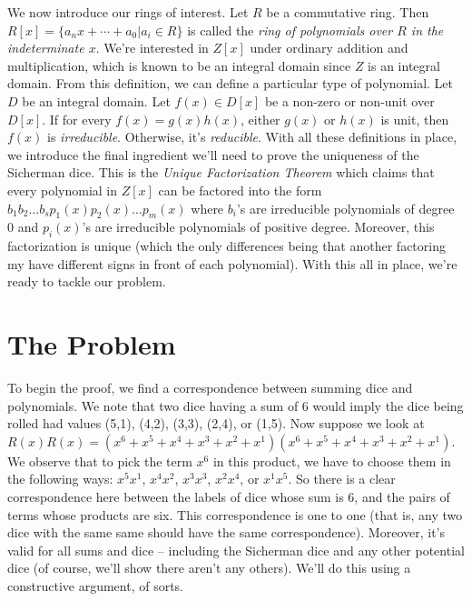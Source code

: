 \documentclass[12pt]{report}
\begin{document}
We now introduce our rings of interest. Let $R$ be a commutative ring. Then
$R[x]=\{ a_{n}x + \cdots + a_{0} | a_{i}\in R\}$ is called the \textit{ring of polynomials over $R$ in the
indeterminate $x$}. We're interested in $Z[x]$ under ordinary addition and multiplication, which is known to
be an integral domain since $Z$ is an integral domain. From this definition, we can define a particular type
of polynomial. Let $D$ be an integral domain. Let $f(x)\in D[x]$ be a non-zero or non-unit over $D[x]$. If for
every $f(x)=g(x)h(x)$, either $g(x)$ or $h(x)$ is unit, then $f(x)$ is \textit{irreducible}. Otherwise, it's
\textit{reducible}. With all these definitions in place, we introduce the final ingredient we'll need to prove
the uniqueness of the Sicherman dice. This is the \textit{Unique Factorization Theorem} which claims that
every polynomial in $Z[x]$ can be factored into the form
$b_{1}b_{2}\ldots b_{s}p_{1}(x)p_{2}(x)\ldots p_{m}(x)$ where $b_{i}$'s are irreducible polynomials of degree
$0$ and $p_{i}(x)$'s are irreducible polynomials of positive degree. Moreover, this factorization is unique
(which the only differences being that another factoring my have different signs in front of each polynomial).
With this all in place, we're ready to tackle our problem.

\section*{The Problem}
To begin the proof, we find a correspondence between summing dice and polynomials. We note that two dice
having a sum of 6 would imply the dice being rolled had values (5,1), (4,2), (3,3), (2,4), or (1,5). Now
suppose we look at $R(x)R(x)=(x^{6}+x^{5}+x^{4}+x^{3}+x^{2}+x^{1})(x^{6}+x^{5}+x^{4}+x^{3}+x^{2}+x^{1})$. We
observe that to pick the term $x^{6}$ in this product, we have to choose them in the following ways:
$x^{5}x^{1}$, $x^{4}x^{2}$, $x^{3}x^{3}$, $x^{2}x^{4}$, or $x^{1}x^{5}$. So there is a clear correspondence
here between the labels of dice whose sum is 6, and the pairs of terms whose products are six. This
correspondence is one to one (that is, any two dice with the same same should have the same correspondence).
Moreover, it's valid for all sums and dice -- including the Sicherman dice and any other potential dice (of
course, we'll show there aren't any others). We'll do this using a constructive argument, of sorts.
\end{document}
